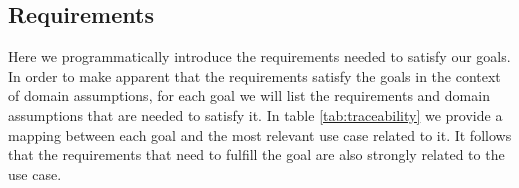 \subsection{Requirements}
Here we programmatically introduce the requirements needed to satisfy our goals.
In order to make apparent that the requirements satisfy the goals in the context
of domain assumptions, for each goal we will list the requirements and domain
assumptions that are needed to satisfy it.
In table \vref{tab:traceability} we provide a mapping between each goal and the
most relevant use case related to it. It follows that the requirements that
need to fulfill the goal are also strongly related to the use case.

\begin{description}
    \begin{description}
    \end{description}
    \begin{description}
    \end{description}
    \begin{description}
    \end{description}
    \begin{description}
    \end{description}
    \begin{description}
    \end{description}
    \begin{description}
    \end{description}
    \begin{description}
    \end{description}
\end{description}

